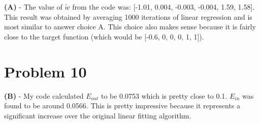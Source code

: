 \documentclass[10pt,letter]{article}
\begin{document}
\textbf{(A)} - The value of $\tilde{w}$ from the code was: [-1.01, 0.004, -0.003, -0.004, 1.59, 1.58]. This result was obtained by averaging 1000 iterations of linear regression and is most similar to answer choice A. This choice also makes sense because it is fairly close to the target function (which would be [-0.6, 0, 0, 0, 1, 1]).

\section*{Problem 10}

\textbf{(B)} - My code calculated $E_{out}$ to be 0.0753 which is pretty close to 0.1. $E_{in}$ was found to be around 0.0566. This is pretty impressive because it represents a significant increase over the original linear fitting algorithm.
\end{document}
